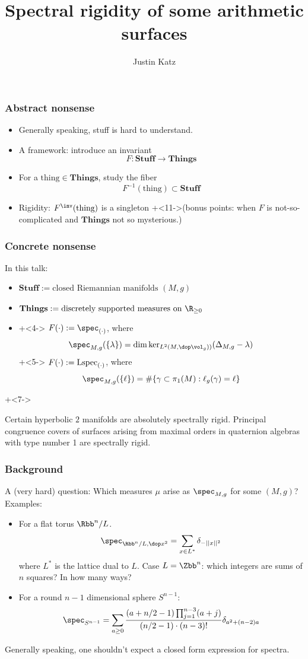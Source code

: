 \documentclass[10pt]{beamer}
\title{Spectral rigidity of some arithmetic surfaces}
\author{Justin Katz}
\institute{Purdue University}
\newcommand{\Stuff}{\ensuremath{\mathbf{Stuff}}}
\newcommand{\Things}{\ensuremath{\mathbf{Things}}}
\newcommand{\thing}{\ensuremath{\text{thing}}}
\newcommand{\Lspec}{{\rm Lspec}}
\begin{document}
\frame{\titlepage}
\begin{frame} \frametitle{Abstract nonsense}
	\begin{itemize}[<+->]
					\item Generally speaking, stuff is hard to understand.
					\item A framework: \pause  introduce an invariant
						\[ F : \Stuff \to \Things \] \pause
					\item For a $\thing \in \Things$\pause, study the fiber 
					\[ F^{-1} (\thing) \subset \Stuff\] \pause
					\item Rigidity:  \pause $F^\inv(\thing)$ is a singleton  \onslide+<11->(bonus points: when $F$ is not-so-complicated and $\Things$ not so mysterious.)
	\end{itemize}
	\end{frame}
\begin{frame}  \frametitle{Concrete nonsense}
In this talk: \pause 
	   \begin{itemize}
					\item<2-> $ \Stuff:= \text{closed Riemannian manifolds } (M,g) $
					\item<3-> $\Things:=\text{discretely supported measures on } \R_{\geq 0}$
					\item<4-> \onslide+<4->{ $F(\cdot) := \spec_{(\cdot)}$, where
		 				\[ \spec_{M,g} ( \{\lambda\} ) = \dim \ker_{L^2(M,\dop \vol_g))} (\Delta_{M,g} - \lambda 
		 				)\] }  \onslide+<5-> {$F(\cdot) := \Lspec_{(\cdot)}$, where
		 				\[ \spec_{M,g} ( \{\ell \} ) =  \# \{ \gamma \subset \pi_1(M): \ell_g(\gamma)= \ell  \}  \]} 
	\end{itemize} \onslide+<7->
\begin{thm}
	Certain hyperbolic $2$ manifolds are absolutely spectrally rigid. Principal congruence covers of surfaces arising from maximal orders  in quaternion algebras with type number 1 are spectrally rigid. 
\end{thm}
	\end{frame}
\begin{frame} \frametitle{Background}
A (very hard) question: \pause Which measures $\mu$ arise as $\spec_{M,g}$ for some $(M,g)$?  \pause \\ 
 Examples:
			\begin{itemize}[<+->]
				\item For a flat torus $\Rbb^n / L$.
					\[ \spec_{\Rbb^n/L, \dop x^2}  = \sum_{x \in L^*}  \delta_{-||x||^2 }   \]
				where $L^*$ is the lattice dual to $L$. \pause  Case  $L=\Zbb^n$: which integers are sums of $n$ squares? \pause In how many ways?  \pause
				\item For a round $n-1$ dimensional sphere $S^{n-1}$: \pause 
					\[ \spec_{S^{n-1} }  =   \sum_{a \geq 0} \frac{(a+n/2 -1) \prod_{j=1}^{n-3} (a+j)}{(n/2-1)\cdot (n-3)! }\delta_{a^2 + (n-2) a }\]
			\end{itemize}
\pause
Generally speaking, one shouldn't expect a closed form expression for spectra. 
\end{frame}%
\end{document}

